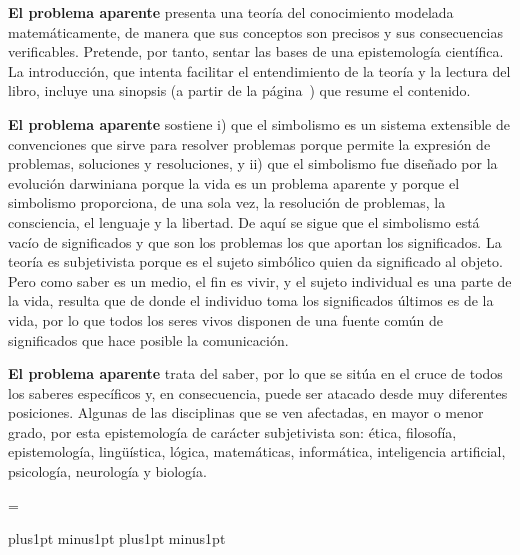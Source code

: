 \null
{\bf El problema aparente} presenta una teoría del conocimiento modelada
matemáticamente, de manera que sus conceptos son precisos y sus
consecuencias verificables. Pretende, por tanto, sentar las bases de una
epistemología científica. La introducción, que intenta facilitar el
entendimiento de la teoría y la lectura del libro, incluye una sinopsis (a
partir de la página~{}) que resume el contenido.

\null
{\bf El problema aparente} sostiene i) que el simbolismo es un sistema
extensible de convenciones que sirve para resolver problemas porque permite
la expresión de problemas, soluciones y resoluciones, y ii) que el
simbolismo fue diseñado por la evolución darwiniana porque la vida es un
problema aparente y porque el simbolismo proporciona, de una sola vez, la
resolución de problemas, la consciencia, el lenguaje y la libertad. De aquí
se sigue que el simbolismo está vacío de significados y que son los
problemas los que aportan los significados. La teoría es subjetivista porque
es el sujeto simbólico quien da significado al objeto. Pero como saber es un
medio, el fin es vivir, y el sujeto individual es una parte de la vida,
resulta que de donde el individuo toma los significados últimos es de la
vida, por lo que todos los seres vivos disponen de una fuente común de
significados que hace posible la comunicación.

\null
{\bf El problema aparente} trata del saber, por lo que se sitúa en el cruce
de todos los saberes específicos y, en consecuencia, puede ser atacado desde
muy diferentes posiciones. Algunas de las disciplinas que se ven afectadas,
en mayor o menor grado, por esta epistemología de carácter subjetivista son:
 ética, filosofía, epistemología,
 lingüística, lógica, matemáticas,
 informática, inteligencia artificial,
 psicología, neurología y biología.

\break %

\background
\pdfWhite


\null
\vsize=\vpage \advance\vsize-72bp
\baselineskip

\ptextfont
\parindent=0pt
\parskip=0pt plus1pt minus1pt
\baselineskip=13.3pt plus1pt minus1pt %

